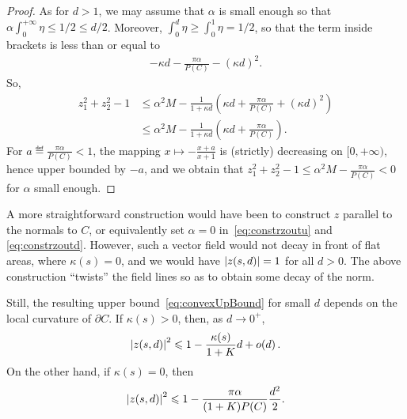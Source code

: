 \begin{proof}
As for $d>1$, we may assume that $\alpha$ is small enough so that $\alpha \int_0^{+\infty}\eta \leq 1/2\leq d/2$. Moreover, $\int_0^d\eta\geq \int_0^1\eta=1/2$, so that the term inside brackets is less than or equal to
\begin{align*}
 -\kappa d- \frac{\pi \alpha}{P(C)} - (\kappa d)^2.
\end{align*}
So,
\begin{align*}
  z_1^2+z_2^2-1&\leq  \alpha^2M -\frac{1}{1+\kappa d}  \left(\kappa d+ \frac{\pi \alpha}{P(C)} + (\kappa d)^2 \right)\\
               &\leq  \alpha^2M - \frac{1}{1+\kappa d}  \left(\kappa d+ \frac{\pi \alpha}{P(C)} \right).
\end{align*}
For $a\eqdef \frac{\pi \alpha}{P(C)}<1$, the mapping $x\mapsto -\frac{x+a}{x+1}$ is (strictly) decreasing on $[0,+\infty)$, hence upper bounded by $-a$, and we obtain that $z_1^2+z_2^2-1\leq \alpha^2M  -\frac{\pi \alpha}{P(C)}<0$ for $\alpha$ small enough.
\end{proof}

\begin{rem}\label{rem:decayz}
  A more straightforward construction would have been to construct $z$ parallel to the normals to $C$, or equivalently set $\alpha=0$ in~\eqref{eq:constrzoutu} and \eqref{eq:constrzoutd}. However, such a vector field would not decay in front of flat areas, where $\kappa(s)=0$, and we would have $\left| z(s,d) \right|=1$ for all $d>0$. The above construction ``twists'' the field lines so as to obtain some decay of the norm. 
  
Still, the resulting upper bound~\eqref{eq:convexUpBound} for small $d$ depends on the local curvature of $\partial C$.
  If $\kappa(s)>0$, then, as $d\to 0^+$,
  \begin{equation*}
  \left| z(s,d) \right|^2 \leqslant  1-\frac{\kappa(s)}{1+K}d + o\mathopen{}\left(d\right) .
  \end{equation*}
  On the other hand, if $\kappa(s)=0$, then
  \begin{equation*}
    \left| z(s,d) \right|^2 \leqslant  1-\frac{\pi \alpha}{(1+K)P(C)}\frac{d^2}{2}.
  \end{equation*}
\end{rem}



